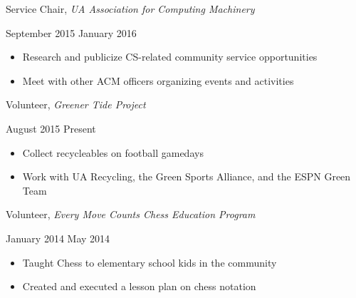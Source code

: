 \documentclass[11pt]{article}
\begin{document}
\vspace{0.4em}
\begin{minipage}[t]{0.65\textwidth}
\flushleft
Service Chair, \textit{UA Association for Computing Machinery}\\
\end{minipage}
\begin{minipage}[t]{0.3\textwidth}
\flushright
September 2015 \space \textemdash \space January 2016\\
\end{minipage}

\begin{itemize}
  \item Research and publicize CS-related community service opportunities
  \item Meet with other ACM officers organizing events and activities
\end{itemize}

\vspace{0.4em}
\begin{minipage}[t]{0.7\textwidth}
\flushleft
Volunteer, \textit{Greener Tide Project}\\
\end{minipage}
\begin{minipage}[t]{0.25\textwidth}
\flushright
August 2015 \space \textemdash \space Present\\
\end{minipage}

\begin{itemize}
  \item Collect recycleables on football gamedays
  \item Work with UA Recycling, the Green Sports Alliance, and the ESPN Green Team
\end{itemize}

\vspace{0.4em}
\begin{minipage}[t]{0.7\textwidth}
\flushleft
Volunteer, \textit{Every Move Counts Chess Education Program}\\
\end{minipage}
\begin{minipage}[t]{0.25\textwidth}
\flushright
January 2014 \space \textemdash \space May 2014\\
\end{minipage}

\begin{itemize}
  \item Taught Chess to elementary school kids in the community
  \item Created and executed a lesson plan on chess notation
\end{itemize}
\end{document}
